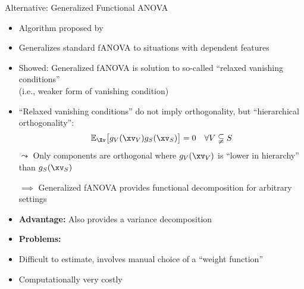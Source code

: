 \documentclass[11pt,compress,t,notes=noshow, aspectratio=169, xcolor=table]{beamer}
\begin{document}
\begin{frame}{Alternative: Generalized Functional ANOVA}

\begin{itemize}
    \item Algorithm proposed by 
    \item Generalizes standard fANOVA to situations with dependent features
    \pause
    \item Showed: Generalized fANOVA is solution to so-called ``relaxed vanishing conditions'' \\
    (i.e., weaker form of vanishing condition) \\
    \item ``Relaxed vanishing conditions'' do not imply orthogonality, but ``hierarchical orthogonality'':
    $$
    \mathbb{E}_{\Xv} \bigl[ g_{V}(\xv_V) g_{S}(\xv_S) \bigr] = 0 \quad \forall V \subsetneqq S
    $$
    \pause
    $\leadsto$ Only components are orthogonal where $g_{V}(\xv_V)$ is ``lower in hierarchy'' than $g_{S}(\xv_S)$
    \item[$\implies$] Generalized fANOVA provides functional decomposition for arbitrary settings
    \item \textbf{Advantage:} Also provides a variance decomposition
    \pause
    \item \textbf{Problems:}
    \item Difficult to estimate, involves manual choice of a ``weight function''
    \item Computationally very costly
    
\end{itemize}



    
\end{frame}
\end{document}
